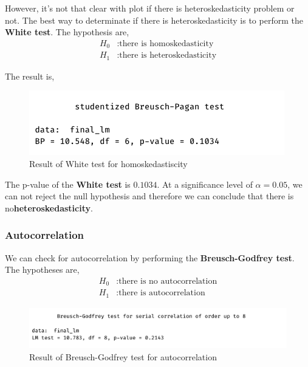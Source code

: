 However, it's not that clear with plot if there is heteroskedasticity problem or not. The best way to determinate if there is heteroskedasticity is to perform the \textbf{White test}. The hypothesis are,
\begin{align*}
	H_0&: \text{there is homoskedasticity} \\
	H_1&: \text{there is heteroskedasticity}
\end{align*}

The result is,
\begin{figure}[H]
	\centering
	\includegraphics{figures/models/white_test.png}
	\caption{Result of White test for homoskedastiscity}
	\label{fig:white_test}
\end{figure}

The p-value of the \textbf{White test} is $0.1034$. At a significance level of $\alpha = 0.05$, we can not reject the null hypothesis and therefore we can conclude that there is no\textbf{heteroskedasticity}.



\subsubsection{Autocorrelation}

We can check for autocorrelation by performing the \textbf{Breusch-Godfrey test}. The hypotheses are,
\begin{align*}
	H_0&: \text{there is no autocorrelation} \\
	H_1&: \text{there is autocorrelation}
\end{align*}

\begin{figure}[H]
	\centering
	\includegraphics{figures/models/Breusch-Godfrey_test.png}
	\caption{Result of Breusch-Godfrey test for autocorrelation}
	\label{fig:breusch-godfrey-test}
\end{figure}

